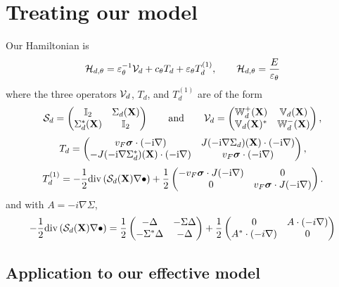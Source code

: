 \documentclass[11pt,a4paper,reqno,french,tikz]{amsart}
\newcommand{\pa}[1]{\left( #1 \right)} %
\let\p\relax\newcommand{\p}{\psi} %
\newcommand{\na}{\nabla} %
\newcommand{\f}[2]{\frac{#1}{#2}} %
\newcommand{\mat}[1]{\begin{pmatrix} #1 \end{pmatrix}} %
\newcommand{\bbV}{\mathbb{V}}
\def\bX{{\mathbf X}}
\def\bbI{{\mathbb I}}
\def\bbV{{\mathbb V}}
\def\bbW{{\mathbb W}}
\def\ri{{\rm i}}
\newcommand{\ept}{\varepsilon_\theta}
\def\bsigma{{\boldsymbol\sigma}}
\begin{document}
\section{Treating our model}


Our Hamiltonian is
\begin{equation} \label{eq:def:Sigma_d}
    \cH_{d, \theta} = \ept^{-1} \cV_d + c_\theta T_d + \ept T_d^{(1)},\qquad \cH_{d,\theta} \p = \frac{E}{\ept} \p
\end{equation}
where the three operators $\mathcal{V}_d$, $T_d$, and $T_d^{(1)}$ are of the form
\begin{align*}
\cS_d =  \begin{pmatrix}
        \bbI_2 & \Sigma_d(\bX) \\ \Sigma_d^*(\bX) & \bbI_2
    \end{pmatrix} \qquad \mbox{and} \qquad \cV_d = \begin{pmatrix}
        \bbW_d^+(\bX) & \bbV_d(\bX) \\
        \bbV_d(\bX)^* & \bbW_d^-(\bX)
    \end{pmatrix} ,
\end{align*}
\[
    T_d = \begin{pmatrix} v_F \bsigma \cdot ( - \ri \nabla) &  J ( - \ri \nabla \Sigma_d)(\bX) \cdot ( - \ri \nabla) \\
       -  J ( - \ri \nabla \Sigma_d^*)(\bX) \cdot ( - \ri \nabla) & v_F \bsigma \cdot ( - \ri \nabla) \end{pmatrix},
\]
\begin{equation} \label{eq:op_Td1}
    T_d^{(1)} = - \frac12 {\rm div} \left( \cS_d(\bX) \nabla \bullet \right) + \frac12 \begin{pmatrix}
        - v_F \bsigma \cdot J (- \ri \nabla) & 0 \\
        0 & v_F \bsigma \cdot J (- \ri \nabla) \end{pmatrix}.
\end{equation}
and with $A = -i\na \Sigma$,
\begin{align*}
	- \frac12 {\rm div} \left( \cS_d(\bX) \nabla \bullet \right) = \f 12 \mat{ -\Delta & -\Sigma \Delta \\ - \Sigma^* \Delta & - \Delta} + \f 12 \mat{0 & A \cdot \pa{-i\na} \\ A^* \cdot \pa{-i\na} & 0}
\end{align*}


\subsection{Application to our effective model}%
\label{sub:application_to_our_effective_model}
\end{document}
